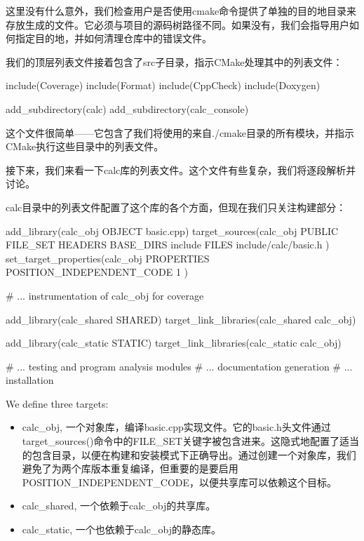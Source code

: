 这里没有什么意外，我们检查用户是否使用cmake命令提供了单独的目的地目录来存放生成的文件。它必须与项目的源码树路径不同。如果没有，我们会指导用户如何指定目的地，并如何清理仓库中的错误文件。

我们的顶层列表文件接着包含了src子目录，指示CMake处理其中的列表文件：


\begin{cmake}
include(Coverage)
include(Format)
include(CppCheck)
include(Doxygen)

add_subdirectory(calc)
add_subdirectory(calc_console)
\end{cmake}

这个文件很简单——它包含了我们将使用的来自./cmake目录的所有模块，并指示CMake执行这些目录中的列表文件。

接下来，我们来看一下calc库的列表文件。这个文件有些复杂，我们将逐段解析并讨论。


calc目录中的列表文件配置了这个库的各个方面，但现在我们只关注构建部分：


\begin{cmake}
add_library(calc_obj OBJECT basic.cpp)
target_sources(calc_obj
               PUBLIC FILE_SET HEADERS
               BASE_DIRS include
               FILES include/calc/basic.h
)
set_target_properties(calc_obj PROPERTIES
    POSITION_INDEPENDENT_CODE 1
)

# ... instrumentation of calc_obj for coverage

add_library(calc_shared SHARED)
target_link_libraries(calc_shared calc_obj)

add_library(calc_static STATIC)
target_link_libraries(calc_static calc_obj)

# ... testing and program analysis modules
# ... documentation generation
# ... installation
\end{cmake}

We define three targets:

\begin{itemize}
\item
calc\_obj, 一个对象库，编译basic.cpp实现文件。它的basic.h头文件通过target\_sources()命令中的FILE\_SET关键字被包含进来。这隐式地配置了适当的包含目录，以便在构建和安装模式下正确导出。通过创建一个对象库，我们避免了为两个库版本重复编译，但重要的是要启用POSITION\_INDEPENDENT\_CODE，以便共享库可以依赖这个目标。

\item
calc\_shared, 一个依赖于calc\_obj的共享库。

\item
calc\_static, 一个也依赖于calc\_obj的静态库。
\end{itemize}

